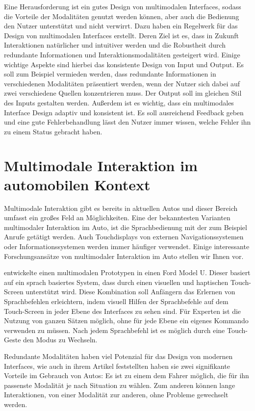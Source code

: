Eine Herausforderung ist ein gutes Design von multimodalen Interfaces, sodass die Vorteile der Modalitäten genutzt werden können, aber auch die Bedienung den Nutzer unterstützt und nicht verwirrt. 
Dazu haben \citet{Reeves_2004} ein Regelwerk für das Design von multimodalen Interfaces erstellt. 
Deren Ziel ist es, dass in Zukunft Interaktionen natürlicher und intuitiver werden und die Robustheit durch redundante Informationen und Interaktionsmodalitäten gesteigert wird. 
Einige wichtige Aspekte sind hierbei das konsistente Design von Input und Output. 
Es soll zum Beispiel vermieden werden, dass redundante Informationen in verschiedenen Modalitäten präsentiert werden, wenn der Nutzer sich dabei auf zwei verschiedene Quellen konzentrieren muss. 
Der Output soll im gleichen Stil des Inputs gestalten werden. 
Außerdem ist es wichtig, dass ein multimodales Interface Design adaptiv und konsistent ist. 
Es soll ausreichend Feedback geben und eine gute Fehlerbehandlung lässt den Nutzer immer wissen, welche Fehler ihn zu einem Status gebracht haben. 

\section[Multimodale Interaktion im Auto]{Multimodale Interaktion im automobilen Kontext}
Multimodale Interaktion gibt es bereits in aktuellen Autos und dieser Bereich umfasst ein großes Feld an Möglichkeiten. 
Eine der bekanntesten Varianten multimodaler Interaktion im Auto, ist die Sprachbedienung mit der zum Beispiel Anrufe getätigt werden. 
Auch Touchdisplays von externen Navigationssystemen oder Informationssystemen werden immer häufiger verwendet. 
Einige interessante Forschungsansätze von multimodaler Interaktion im Auto stellen wir Ihnen vor.

\citet{Pieraccini_2004} entwickelte einen multimodalen Prototypen in einen Ford Model U. Dieser basiert auf ein sprach basiertes System, dass durch einen visuellen und haptischen Touch-Screen unterstützt wird. 
Diese Kombination soll Anfängern das Erlernen von Sprachbefehlen erleichtern, indem visuell Hilfen der Sprachbefehle auf dem Touch-Screen in jeder Ebene des Interfaces zu sehen sind. 
Für Experten ist die Nutzung von ganzen Sätzen möglich, ohne für jede Ebene ein eigenes Kommando verwenden zu müssen.
Nach jedem Sprachbefehl ist es möglich durch eine Touch-Geste den Modus zu Wechseln. 

Redundante Modalitäten haben viel Potenzial für das Design von modernen Interfaces, wie auch \citet{Muller_2011} in ihrem Artikel feststellten haben sie zwei signifikante Vorteile im Gebrauch von Autos: Es ist zu einem dem Fahrer möglich, die für ihn passenste Modalität je nach Situation zu wählen. 
Zum anderen können lange Interaktionen, von einer Modalität zur anderen, ohne Probleme gewechselt werden.

